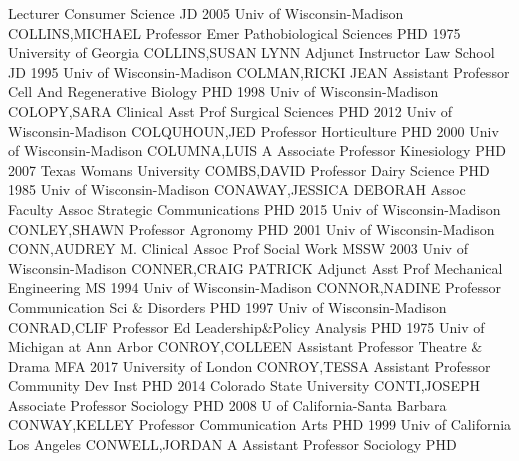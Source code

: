 \documentclass[
]{article}
\begin{document}
 \textbar Lecturer \textbar Consumer Science \textbar JD 2005
Univ of Wisconsin-Madison \textbar COLLINS,MICHAEL \textbar{}
 \textbar Professor Emer \textbar Pathobiological Sciences
\textbar PHD 1975 University of Georgia \textbar COLLINS,SUSAN LYNN
\textbar{}  \textbar Adjunct Instructor \textbar Law School
\textbar JD 1995 Univ of Wisconsin-Madison \textbar COLMAN,RICKI JEAN
\textbar{}  \textbar Assistant Professor \textbar Cell And
Regenerative Biology \textbar PHD 1998 Univ of Wisconsin-Madison
\textbar COLOPY,SARA \textbar{}  \textbar Clinical Asst Prof
\textbar Surgical Sciences \textbar PHD 2012 Univ of Wisconsin-Madison
\textbar COLQUHOUN,JED \textbar{}  \textbar Professor
\textbar Horticulture \textbar PHD 2000 Univ of Wisconsin-Madison
\textbar COLUMNA,LUIS A \textbar{}  \textbar Associate
Professor \textbar Kinesiology \textbar PHD 2007 Texas Womans University
\textbar COMBS,DAVID \textbar{}  \textbar Professor
\textbar Dairy Science \textbar PHD 1985 Univ of Wisconsin-Madison
\textbar CONAWAY,JESSICA DEBORAH \textbar{}  \textbar Assoc
Faculty Assoc \textbar Strategic Communications \textbar PHD 2015 Univ
of Wisconsin-Madison \textbar CONLEY,SHAWN \textbar{} 
\textbar Professor \textbar Agronomy \textbar PHD 2001 Univ of
Wisconsin-Madison \textbar CONN,AUDREY M. \textbar{} 
\textbar Clinical Assoc Prof \textbar Social Work \textbar MSSW 2003
Univ of Wisconsin-Madison \textbar CONNER,CRAIG PATRICK \textbar{}
 \textbar Adjunct Asst Prof \textbar Mechanical Engineering
\textbar MS 1994 Univ of Wisconsin-Madison \textbar CONNOR,NADINE
\textbar{}  \textbar Professor \textbar Communication Sci \&
Disorders \textbar PHD 1997 Univ of Wisconsin-Madison
\textbar CONRAD,CLIF \textbar{}  \textbar Professor
\textbar Ed Leadership\&Policy Analysis \textbar PHD 1975 Univ of
Michigan at Ann Arbor \textbar CONROY,COLLEEN \textbar{} 
\textbar Assistant Professor \textbar Theatre \& Drama \textbar MFA 2017
University of London \textbar CONROY,TESSA \textbar{} 
\textbar Assistant Professor \textbar Community Dev Inst \textbar PHD
2014 Colorado State University \textbar CONTI,JOSEPH \textbar{}
 \textbar Associate Professor \textbar Sociology \textbar PHD
2008 U of California-Santa Barbara \textbar CONWAY,KELLEY \textbar{}
 \textbar Professor \textbar Communication Arts \textbar PHD
1999 Univ of California Los Angeles \textbar CONWELL,JORDAN A \textbar{}
 \textbar Assistant Professor \textbar Sociology \textbar PHD
\end{document}
